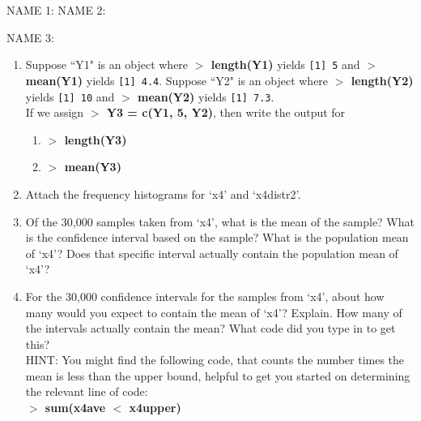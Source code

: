 \documentclass{article}
\newcommand{\Rin}[1]{\textbf{$>$ {#1}}}
\newcommand{\Rout}[1]{\texttt{{#1}}}
\begin{document}
\newpage
\begin{center}
\textbf{}
\end{center}

NAME 1:{\underbar{\hspace{2in}}} \hfill NAME 2:{\underbar{\hspace{2in}} 

\bigskip

NAME 3:{\underbar{\hspace{2in}}

\begin{enumerate}

\item Suppose ``Y1" is an object where \Rin{length(Y1)} yields \Rout{[1] 5} and \Rin{mean(Y1)} yields \Rout{[1] 4.4}. Suppose ``Y2" is an object where \Rin{length(Y2)} yields \Rout{[1] 10} and \Rin{mean(Y2)} yields \Rout{[1] 7.3}. \\
If we assign \Rin{Y3 = c(Y1, 5, Y2)}, then write the output for
	\begin{enumerate}
	\item \Rin{length(Y3)}
	\vspace{0.25cm}
	\item \Rin{mean(Y3)}
	\vspace{0.25cm}
	\end{enumerate}
	
\item Attach the frequency histograms for `x4' and `x4distr2'.
\vspace{0.5cm}

\item Of the 30,000 samples taken from `x4', what is the mean of the  sample? What is the confidence interval based on the  sample? What is the population mean of `x4'? Does that specific interval actually contain the population mean of `x4'?
\vspace{2cm}

\item For the 30,000 confidence intervals for the samples from `x4', about how many would you expect to contain the mean of `x4'? Explain.
How many of the intervals actually contain the mean? What code did you type in to get this? \\
HINT: You might find the following code, that counts the number times the mean is less than the upper bound, helpful to get you started on determining the relevant line of code:\\
  \Rin{sum(x4ave $<$ x4upper)}
  \vfill


\end{enumerate}}}
\end{document}
